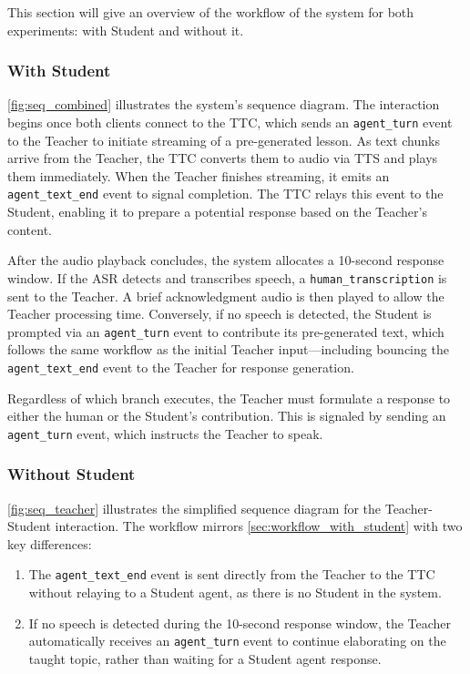 This section will give an overview of the workflow of the system for both experiments: with Student and without it.


\subsubsection{With Student}
\label{sec:workflow_with_student}

\autoref{fig:seq_combined} illustrates the system's sequence diagram. The interaction begins once both clients connect to the TTC, which sends an \texttt{agent\_turn} event to the Teacher to initiate streaming of a pre-generated lesson. As text chunks arrive from the Teacher, the TTC converts them to audio via TTS and plays them immediately. When the Teacher finishes streaming, it emits an \texttt{agent\_text\_end} event to signal completion. The TTC relays this event to the Student, enabling it to prepare a potential response based on the Teacher's content.

After the audio playback concludes, the system allocates a 10-second response window. If the ASR detects and transcribes speech, a \texttt{human\_transcription} is sent to the Teacher. A brief acknowledgment audio is then played to allow the Teacher processing time. Conversely, if no speech is detected, the Student is prompted via an \texttt{agent\_turn} event to contribute its pre-generated text, which follows the same workflow as the initial Teacher input---including bouncing the \texttt{agent\_text\_end} event to the Teacher for response generation.

Regardless of which branch executes, the Teacher must formulate a response to either the human or the Student's contribution. This is signaled by sending an \texttt{agent\_turn} event, which instructs the Teacher to speak.

\subsubsection{Without Student}
\label{sec:workflow_without_student}
\autoref{fig:seq_teacher} illustrates the simplified sequence diagram for the Teacher-Student interaction. The workflow mirrors \autoref{sec:workflow_with_student} with two key differences:

\begin{enumerate}[noitemsep, leftmargin=*]
  \item The \texttt{agent\_text\_end} event is sent directly from the Teacher to the TTC without relaying to a Student agent, as there is no Student in the system.
  \item If no speech is detected during the 10-second response window, the Teacher automatically receives an \texttt{agent\_turn} event to continue elaborating on the taught topic, rather than waiting for a Student agent response.
\end{enumerate}


